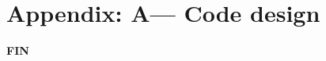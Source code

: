 \documentclass[12pt, a4paper, pdflatex]{report}
\begin{document}
\newpage
\section*{Appendix: A--- Code design\label{ap:code}}

% 


\newpage
\begin{center} \vspace*{5cm}\textbf{\huge FIN}\vspace*{5cm} \end{center}


{}
\end{document}
